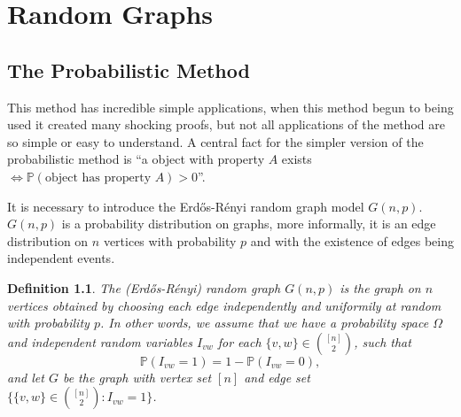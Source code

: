 \documentclass[12pt,twoside,a4paper,bibliography=totocnumbered]{book}
\numberwithin{equation}{section}
\newtheorem{theorem}             {Theorem}[section]
\newtheorem{definition}	[theorem] {Definition}
\theoremstyle{remark}
\begin{document}







\chapter{Random Graphs}
\section{The Probabilistic Method}
This method has incredible simple applications, when this method begun to being used it created many shocking proofs, but not all applications of the method are so simple or easy to understand. A central fact for the simpler version of the probabilistic method is ``a object with property $ A$ exists $\iff  \mathbb{P}(\text{object has property }A)>0$''.

It is necessary to introduce the Erd\H{o}s-Rényi random graph model $G(n,p)$. $G(n,p)$ is a probability distribution on graphs, more informally, it is an edge distribution on $n$ vertices with probability $p$ and with the existence of edges being independent events.

\begin{definition}\label{def:randomgraph}
The (Erd\H{o}s-Rényi) random graph $G(n,p)$ is the graph on $n$ vertices obtained by choosing each edge independently and uniformily at random with probability $p$. In other words, we assume that we have a probability space $\Omega$ and independent random variables $I_{vw}$ for each $\{v,w\} \in \binom{[n]}{2}$, such that
$$\mathbb{P}(I_{vw} = 1) = 1 - \mathbb{P}(I_{vw} = 0),$$ 
and let $G$ be the graph with vertex set $[n]$ and edge set $\{\{v,w\} \in \binom{[n]}{2}: I_{vw} = 1\}$. 

\end{definition}
\end{document}

